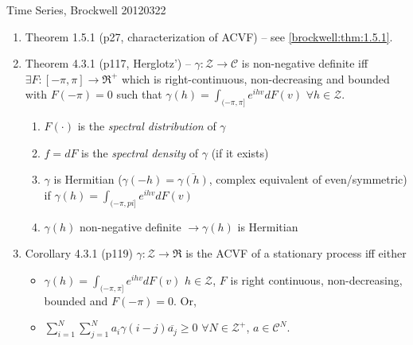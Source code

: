 \documentclass{article}
\newcommand{\Int}{\mathcal{Z}}
\newcommand{\Cplx}{\mathcal{C}}
\begin{document}
\begin{section}{Time Series, Brockwell 20120322}
\begin{enumerate}
\item Theorem 1.5.1 (p27, characterization of ACVF) -- see 
  \ref{brockwell:thm:1.5.1}.
\item Theorem 4.3.1 (p117, Herglotz') -- $\gamma : \Int \to \Cplx$ is 
  non-negative definite iff $\exists F : [-\pi,\pi] \to \Re^+$ which
  is right-continuous, non-decreasing and bounded with $F(-\pi) = 0$ 
  such that $\gamma(h) = \int_{(-\pi,\pi]} e^{ihv} dF(v)$ $\forall h \in \Int$. 
  \begin{enumerate}
  \item $F(\cdot)$ is the \emph{spectral distribution} of $\gamma$
  \item $f = dF$ is the \emph{spectral density} of $\gamma$ (if it exists)
  \item $\gamma$ is Hermitian ($\gamma(-h) = \overline{\gamma(h)}$,
    complex equivalent of even/symmetric) if 
    $\gamma(h) = \int_{(-\pi,pi]} e^{ihv} dF(v)$
  \item $\gamma(h)$ non-negative definite $\to \gamma(h)$ is Hermitian
  \end{enumerate}
\item Corollary 4.3.1 (p119) $\gamma: \Int \to \Re$ is the ACVF of a
  stationary process iff either
  \begin{itemize}
  \item $\gamma(h) = \int_{(-\pi,\pi]} e^{ihv} dF(v)$ $h \in \Int$, 
  $F$ is right continuous, non-decreasing, bounded and $F(-\pi) = 0$. Or,
  \item $\sum_{i=1}^N \sum_{j=1}^N a_i \gamma(i-j) \overline{a_j} \geq 0$
  $\forall N \in \Int^+$, $a \in \Cplx^N$.
  \end{itemize}
\end{enumerate}
\end{section}
\end{document}
